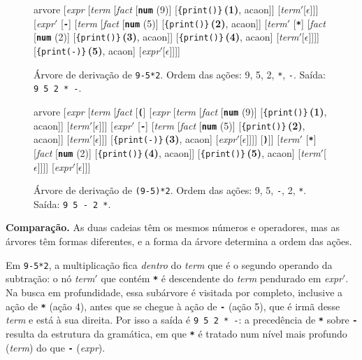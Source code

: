 \documentclass[11pt,a4paper]{article}
\newcommand{\nt}[1]{\textit{#1}}                 %
\newcommand{\tm}[1]{\texttt{\textbf{#1}}}        %
\newcommand{\vazio}{\ensuremath{\epsilon}}
\newcommand{\linha}{\ensuremath{'}}
\newcommand{\acao}[2]{{\color{acao}\texttt{\{print(\textquotesingle#1\textquotesingle)\}}\,\textbf{(#2)}}}
\begin{document}
	\begin{figure}[h]
		\centering
		\begin{forest} arvore
			[\nt{expr}
			[\nt{term}
			[\nt{fact}
			[{\tm{num} (9)}]
			[{\acao{9}{1}}, acaon]]
			[\nt{term}\linha [\vazio]]]
			[\nt{expr}\linha
			[\tm{-}]
			[\nt{term}
			[\nt{fact}
			[{\tm{num} (5)}]
			[{\acao{5}{2}}, acaon]]
			[\nt{term}\linha
			[\tm{*}]
			[\nt{fact}
			[{\tm{num} (2)}]
			[{\acao{2}{3}}, acaon]]
			[{\acao{*}{4}}, acaon]
			[\nt{term}\linha [\vazio]]]]
			[{\acao{-}{5}}, acaon]
			[\nt{expr}\linha [\vazio]]]]
		\end{forest}
		\caption{Árvore de derivação de \texttt{9-5*2}. Ordem das ações: 9, 5, 2, \texttt{*}, \texttt{-}. Saída: \texttt{9 5 2 * -}.}
	\end{figure}
	
	\begin{figure}[h]
		\centering
		\begin{forest} arvore
			[\nt{expr}
			[\nt{term}
			[\nt{fact}
			[\tm{(}]
			[\nt{expr}
			[\nt{term}
			[\nt{fact}
			[{\tm{num} (9)}]
			[{\acao{9}{1}}, acaon]]
			[\nt{term}\linha [\vazio]]]
			[\nt{expr}\linha
			[\tm{-}]
			[\nt{term}
			[\nt{fact}
			[{\tm{num} (5)}]
			[{\acao{5}{2}}, acaon]]
			[\nt{term}\linha [\vazio]]]
			[{\acao{-}{3}}, acaon]
			[\nt{expr}\linha [\vazio]]]]
			[\tm{)}]]
			[\nt{term}\linha
			[\tm{*}]
			[\nt{fact}
			[{\tm{num} (2)}]
			[{\acao{2}{4}}, acaon]]
			[{\acao{*}{5}}, acaon]
			[\nt{term}\linha [\vazio]]]]
			[\nt{expr}\linha [\vazio]]]
		\end{forest}
		\caption{Árvore de derivação de \texttt{(9-5)*2}. Ordem das ações: 9, 5, \texttt{-}, 2, \texttt{*}. Saída: \texttt{9 5 - 2 *}.}
	\end{figure}
	
	\textbf{Comparação.} As duas cadeias têm os mesmos números e operadores, mas as árvores têm formas diferentes, e a forma da árvore determina a ordem das ações.
	
	Em \texttt{9-5*2}, a multiplicação fica \emph{dentro} do \nt{term} que é o segundo operando da subtração: o nó \nt{term}\linha{} que contém \tm{*} é descendente do \nt{term} pendurado em \nt{expr}\linha. Na busca em profundidade, essa subárvore é visitada por completo, inclusive a ação de \tm{*} (ação 4), antes que se chegue à ação de \tm{-} (ação 5), que é irmã desse \nt{term} e está à sua direita. Por isso a saída é \texttt{9 5 2 * -}: a precedência de \tm{*} sobre \tm{-} resulta da estrutura da gramática, em que \tm{*} é tratado num nível mais profundo (\nt{term}) do que \tm{-} (\nt{expr}).
	
\end{document}
